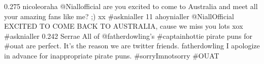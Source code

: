 %
%
{0.275}
{\joinNameTweet
{nicoleoraha}
{@Niallofficial are you excited to come to Australia and meet all your amazing fans like me? ;) xx \#asknialler 11}}
{\joinNameTweet
{ahoynialler}
{@NiallOfficial EXCITED TO COME BACK TO AUSTRALIA, cause we miss you lots xox \#asknialler}}
%
%
%
%
%
%
{0.242}
{\joinNameTweet
{Serrae}
{All of @fatherdowling's \#captainhottie pirate puns for \#ouat are perfect. It's the reason we are twitter friends.}}
{\joinNameTweet
{fatherdowling}
{I apologize in advance for inappropriate pirate puns. \#sorryImnotsorry \#OUAT}}
